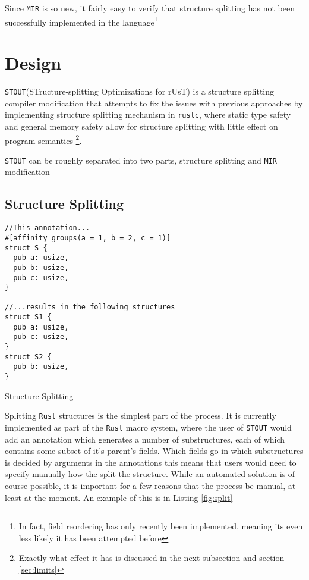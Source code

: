 \documentclass[prodmode,acmtecs]{acmsmall} %
\newcommand{\rustname}{{\texttt{Rust}}}
\def \rust {\rustname{}\xspace}
\newcommand{\rustcname}{{\texttt{rustc}}}
\def \rustc {\rustcname{}\xspace}
\newcommand{\mirname}{{\texttt{MIR}}}
\def \mir {\mirname{}\xspace}
\newcommand{\projectname}{{\texttt{STOUT}}}
\def \name{\projectname\xspace}
\begin{document}
  Since \mir is so new, it fairly easy to verify that structure splitting has
  not been successfully implemented in the language\footnote{In fact, field
  reordering has only recently been implemented, meaning its even less
  likely it has been attempted before}

\section{Design}

\name (STructure-splitting Optimizations for rUsT) is a structure 
splitting compiler modification that attempts to fix the issues with
previous approaches by implementing structure splitting 
mechanism in \rustc, where static type
safety and general memory safety allow for 
structure splitting with little effect on program
semantics
\footnote{Exactly what effect it has is discussed in the next subsection and section \ref{sec:limits}}.

\name can be roughly separated into 
two parts, 
structure splitting
and \mir modification

\subsection{Structure Splitting}

\begin{listing}[h]
\begin{verbatim}
//This annotation...
#[affinity_groups(a = 1, b = 2, c = 1)]
struct S {
  pub a: usize,
  pub b: usize,
  pub c: usize,
}

//...results in the following structures
struct S1 {
  pub a: usize,
  pub c: usize,
}
struct S2 {
  pub b: usize,
}
\end{verbatim}
  \caption{Structure Splitting}
  \label{fig:split}
\end{listing}

Splitting \rust structures is the simplest part of the process. It is currently
implemented as part of the \rust macro system, where the user of \name
would add an annotation which generates a number
of substructures, each of which contains some subset of it's parent's 
fields. Which fields go in which substructures is decided by arguments 
in the annotations 
this means
that users would need to specify manually how the split the structure. While an
automated solution is of course possible, it is important for a few reasons that
the process be manual, at least at the moment. An example of this
is in Listing \ref{fig:split}
\end{document}

